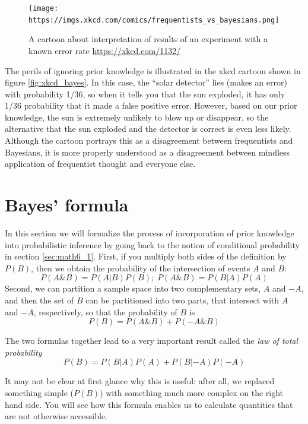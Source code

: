 \documentclass[
]{book}
\theoremstyle{definition}
\theoremstyle{definition}
\theoremstyle{definition}
\theoremstyle{remark}
\begin{document}
\begin{figure}
\centering
\texttt{[image: https://imgs.xkcd.com/comics/frequentists\_vs\_bayesians.png]}
\caption{A cartoon about interpretation of results of an experiment with a known error rate \url{https://xkcd.com/1132/}}
\end{figure}

The perils of ignoring prior knowledge is illustrated in the xkcd cartoon shown in figure \ref{fig:xkcd_bayes}. In this case, the ``solar detector'' lies (makes an error) with probability 1/36, so when it tells you that the sun exploded, it has only 1/36 probability that it made a false positive error. However, based on our prior knowledge, the sun is extremely unlikely to blow up or disappear, so the alternative that the sun exploded and the detector is correct is even less likely. Although the cartoon portrays this as a disagreement between frequentists and Bayesians, it is more properly understood as a disagreement between mindless application of frequentist thought and everyone else.

\hypertarget{bayes-formula}{%
\section{Bayes' formula}\label{bayes-formula}}

\label{sec:math7}

In this section we will formalize the process of incorporation of prior knowledge into probabilistic inference by going back to the notion of conditional probability in section \ref{sec:math6_1}. First, if you multiply both sides of the definition by \(P(B)\), then we obtain the probability of the intersection of events \(A\) and \(B\):
\[P(A \& B) = P(A|B) P(B); \;  P(A \& B) = P(B|A) P(A) \]
Second, we can partition a sample space into two complementary sets, \(A\) and \(-A\), and then the set of \(B\) can be partitioned into two parts, that intersect with \(A\) and \(-A\), respectively, so that the probability of \(B\) is
\[P(B) = P(A \& B) + P(-A\& B)\]

The two formulas together lead to a very important result called the \emph{law of total probability}
\[
P(B) =  P(B|A) P(A) + P(B|-A)P(-A)
\]

It may not be clear at first glance why this is useful: after all, we replaced something simple (\(P(B)\)) with something much more complex on the right hand side. You will see how this formula enables us to calculate quantities that are not otherwise accessible.
\end{document}

